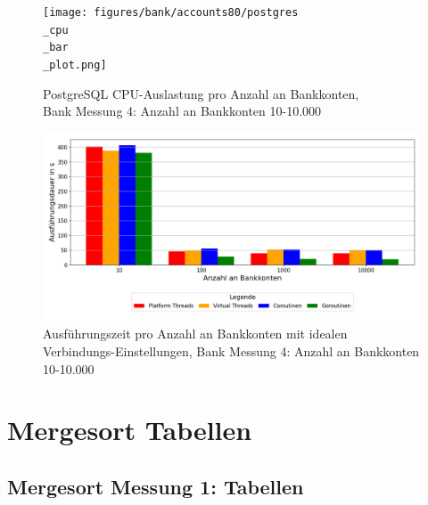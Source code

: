 \documentclass[fontsize=12pt,paper=a4,twoside=semi,parskip=half-,headsepline,headinclude]{scrreprt}
\begin{document}
\begin{figure}[H]
	\centering
	\texttt{[image: figures/bank/accounts80/postgres\\\_cpu\\\_bar\\\_plot.png]}
	\caption{PostgreSQL CPU-Auslastung pro Anzahl an Bankkonten,\\ Bank Messung 4: Anzahl an Bankkonten 10-10.000}
	\label{fig:bankAccounts80PostgCPU}
\end{figure}

\begin{figure}[H]
	\centering
	\includegraphics[scale=0.5]{figures/bank/accountsIdeal/execution_time_plot.png}
	\caption{Ausführungszeit pro Anzahl an Bankkonten mit idealen Verbindungs-Einstellungen, Bank Messung 4: Anzahl an Bankkonten 10-10.000}
	\label{fig:bankAccountsIdealZeit}
\end{figure}

\section{Mergesort Tabellen}

\subsection{Mergesort Messung 1: Tabellen}
\end{document}
